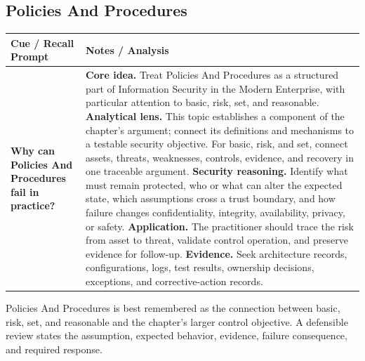 \documentclass[11pt]{article}
\newcommand{\CornellHeader}{%
\rowcolor{Navy}\color{white}\bfseries Cue / Recall Prompt & \color{white}\bfseries Notes / Analysis\\\hline}
\newcommand{\CornellRow}[2]{%
\cellcolor{CueGray}\RaggedRight\textbf{#1} & \RaggedRight #2\\\hline}
\begin{document}
\subsection*{Policies And Procedures}
\begin{longtable}{>{\RaggedRight\arraybackslash}p{}|>{\RaggedRight\arraybackslash}p{}}
\CornellHeader
\CornellRow{Why can Policies And Procedures fail in practice?}{\textbf{Core idea.} Treat Policies And Procedures as a structured part of Information Security in the Modern Enterprise, with particular attention to basic, risk, set, and reasonable. \textbf{Analytical lens.} This topic establishes a component of the chapter's argument; connect its definitions and mechanisms to a testable security objective. For basic, risk, and set, connect assets, threats, weaknesses, controls, evidence, and recovery in one traceable argument. \textbf{Security reasoning.} Identify what must remain protected, who or what can alter the expected state, which assumptions cross a trust boundary, and how failure changes confidentiality, integrity, availability, privacy, or safety. \textbf{Application.} The practitioner should trace the risk from asset to threat, validate control operation, and preserve evidence for follow-up. \textbf{Evidence.} Seek architecture records, configurations, logs, test results, ownership decisions, exceptions, and corrective-action records.}
\end{longtable}
\begin{topicsummary}
Policies And Procedures is best remembered as the connection between basic, risk, set, and reasonable and the chapter's larger control objective. A defensible review states the assumption, expected behavior, evidence, failure consequence, and required response.
\end{topicsummary}
\end{document}
